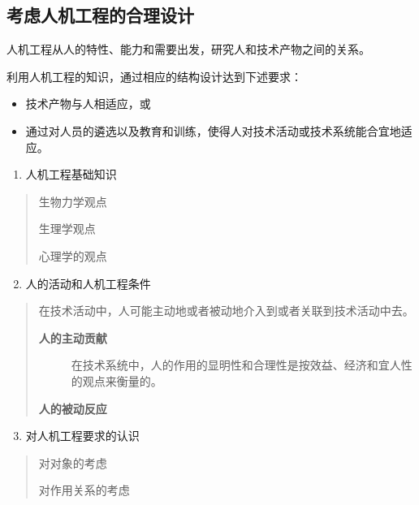 \documentclass[letterpaper,10pt,english]{sphinxmanual}
\begin{document}
\subsection{考虑人机工程的合理设计}
\label{unit6:id18}
人机工程从人的特性、能力和需要出发，研究人和技术产物之间的关系。

利用人机工程的知识，通过相应的结构设计达到下述要求：
\begin{itemize}
\item {} 
技术产物与人相适应，或

\item {} 
通过对人员的遴选以及教育和训练，使得人对技术活动或技术系统能合宜地适应。

\end{itemize}
\begin{enumerate}
\item {} 
人机工程基础知识

\end{enumerate}
\begin{quote}

生物力学观点

生理学观点

心理学的观点
\end{quote}
\begin{enumerate}
\setcounter{enumi}{1}
\item {} 
人的活动和人机工程条件

\end{enumerate}
\begin{quote}

在技术活动中，人可能主动地或者被动地介入到或者关联到技术活动中去。
\begin{description}
\item[{\textbf{人的主动贡献}}] \leavevmode
在技术系统中，人的作用的显明性和合理性是按效益、经济和宜人性的观点来衡量的。

\end{description}

\textbf{人的被动反应}
\end{quote}
\begin{enumerate}
\setcounter{enumi}{2}
\item {} 
对人机工程要求的认识

\end{enumerate}
\begin{quote}

对对象的考虑

对作用关系的考虑
\end{quote}
\end{document}
